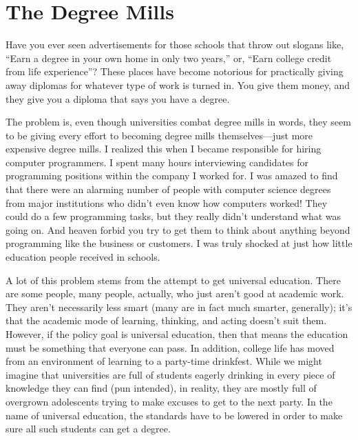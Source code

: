 \documentclass[letterpaper]{article}
\begin{document}
\section{The Degree Mills}
{\color{black}
Have you ever seen advertisements for those
\textcolor[rgb]{0.32941177,0.5529412,0.83137256}{schools that throw out
slogans like, “Earn a degree in your own home in only two years,” or,
“Earn college credit from life experience”?}  These places have become
notorious for practically giving away diplomas for whatever type of
work is turned in. You give them money, and they give you a diploma
that says you have a degree.}

{\color{black}
The problem is, even though universities combat degree mills in words,
they seem to be giving every effort to becoming degree mills
themselves—just more expensive degree mills. I realized this when I
became responsible for hiring computer programmers. I spent many hours
interviewing candidates for programming positions within the company I
worked for. I was amazed to find that there were an alarming number of
people with computer science degrees from major institutions who didn’t
even know how computers worked!  They could do a few programming tasks,
but they really didn’t understand what was going on. And heaven forbid
you try to get them to think about anything beyond programming like the
business or customers. I was truly shocked at just how little education
people received in schools.}

{\color{black}
A lot of this problem stems from the attempt to get universal education.
There are some people, many people, actually, who just aren’t good at
academic work. They aren’t necessarily less smart (many are in fact
much smarter, generally); it’s that the academic mode of learning,
thinking, and acting doesn’t suit them. However, if the policy goal is
universal education, then that means the education must be something
that everyone can pass. In addition, college life has moved from an
environment of learning to a party-time drinkfest. While we might
imagine that universities are full of students eagerly drinking in
every piece of knowledge they can find
\textcolor[rgb]{0.32941177,0.5529412,0.83137256}{(pun intended)}, in
reality, \textcolor[rgb]{0.32941177,0.5529412,0.83137256}{they are
mostly f}ull of overgrown adolescents trying to make excuses to get to
the next party. In the name of universal education, the standards have
to be lowered in order to make sure all such students can get a
degree.}
\end{document}
